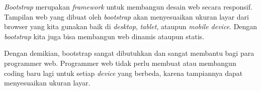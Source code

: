 		
		\textit{Bootstrap} merupakan \textit{framework} untuk membangun desain web secara responsif. Tampilan web yang dibuat oleh \textit{bootstrap} akan menyesuaikan ukuran layar dari browser yang kita gunakan baik di \textit{desktop}, \textit{tablet}, ataupun \textit{mobile device}. Dengan \textit{bootstrap} kita juga bisa membangun web dinamis ataupun statis.
		
		Dengan demikian, bootstrap sangat dibutuhkan dan sangat membantu bagi para programmer web. Programmer web tidak perlu membuat atau membangun coding baru lagi untuk setiap \textit{device} yang berbeda, karena tampiannya dapat menyesuaikan ukuran layar. 
		
		
		
		
			
			
			


			
